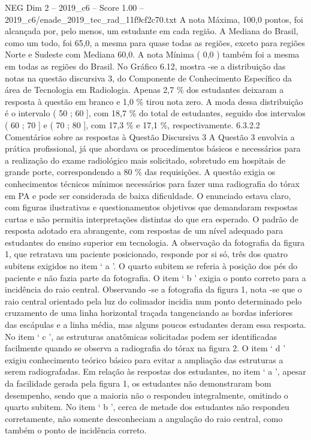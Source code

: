 \begin{textsample}{NEG Dim 2 – 2019\_c6 – Score 1.00 – 2019\_c6/enade\_2019\_tec\_rad\_11f9cf2c70.txt}
A nota Máxima, 100,0 pontos, foi alcançada por, pelo menos, um estudante em cada região.
A Mediana do Brasil, como um todo, foi 65,0, a mesma para quase todas as regiões, exceto para regiões Norte e Sudeste com Mediana 60,0.
A nota Mínima ( 0,0 ) também foi a mesma em todas as regiões do Brasil.
No Gráfico 6.12, mostra -se a distribuição das notas na questão discursiva 3, do Componente de Conhecimento Específico da área de Tecnologia em Radiologia.
Apenas 2,7 \% dos estudantes deixaram a resposta à questão em branco e 1,0 \% tirou nota zero.
A moda dessa distribuição é o intervalo ( 50 ; 60 ], com 18,7 \% do total de estudantes, seguido dos intervalos ( 60 ; 70 ] e ( 70 ; 80 ], com 17,3 \% e 17,1 \%, respectivamente. 6.3.2.2 Comentários sobre as respostas à Questão Discursiva 3 A Questão 3 envolvia a prática profissional, já que abordava os procedimentos básicos e necessários para a realização do exame radiológico mais solicitado, sobretudo em hospitais de grande porte, correspondendo a 80 \% das requisições.
A questão exigia os conhecimentos técnicos mínimos necessários para fazer uma radiografia do tórax em PA e pode ser considerada de baixa dificuldade.
O enunciado estava claro, com figuras ilustrativas e questionamentos objetivos que demandaram respostas curtas e não permitia interpretações distintas do que era esperado.
O padrão de resposta adotado era abrangente, com respostas de um nível adequado para estudantes do ensino superior em tecnologia.
A observação da fotografia da figura 1, que retratava um paciente posicionado, responde por si só, três dos quatro subitens exigidos no item ‘ a ’.
O quarto subitem se referia à posição dos pés do paciente e não fazia parte da fotografia.
O item ‘ b ’ exigia o ponto correto para a incidência do raio central.
Observando -se a fotografia da figura 1, nota -se que o raio central orientado pela luz do colimador incidia num ponto determinado pelo cruzamento de uma linha horizontal traçada tangenciando as bordas inferiores das escápulas e a linha média, mas alguns poucos estudantes deram essa resposta.
No item ‘ c ’, as estruturas anatômicas solicitadas podem ser identificadas facilmente quando se observa a radiografia do tórax na figura 2.
O item ‘ d ’ exigiu conhecimento teórico básico para evitar a ampliação das estruturas a serem radiografadas.
Em relação às respostas dos estudantes, no item ‘ a ’, apesar da facilidade gerada pela figura 1, os estudantes não demonstraram bom desempenho, sendo que a maioria não o respondeu integralmente, omitindo o quarto subitem.
No item ‘ b ’, cerca de metade dos estudantes não respondeu corretamente, não somente desconheciam a angulação do raio central, como também o ponto de incidência correto.

\end{textsample}
